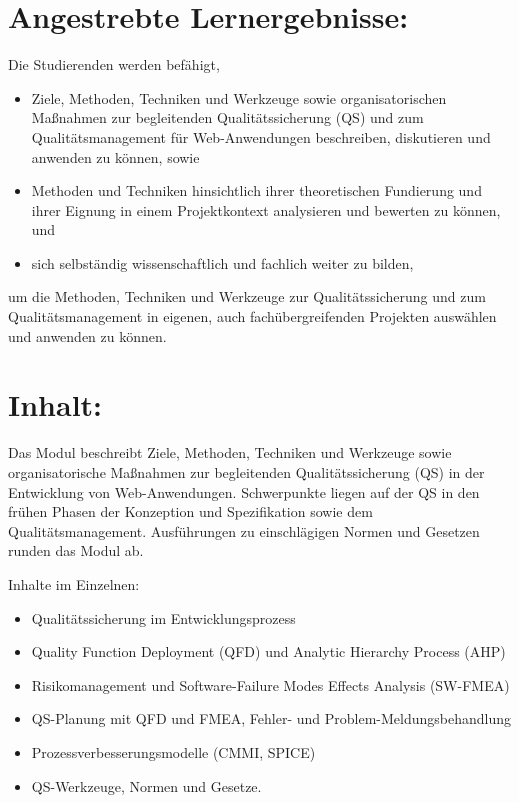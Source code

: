 \section*{Angestrebte
Lernergebnisse:}\label{angestrebte-lernergebnisse-21}

Die Studierenden werden befähigt,

\begin{itemize}
\tightlist
\item
  Ziele, Methoden, Techniken und Werkzeuge sowie organisatorischen
  Maßnahmen zur begleitenden Qualitätssicherung (QS) und zum
  Qualitätsmanagement für Web-Anwendungen beschreiben, diskutieren und
  anwenden zu können, sowie
\item
  Methoden und Techniken hinsichtlich ihrer theoretischen Fundierung und
  ihrer Eignung in einem Projektkontext analysieren und bewerten zu
  können, und
\item
  sich selbständig wissenschaftlich und fachlich weiter zu bilden,
\end{itemize}

um die Methoden, Techniken und Werkzeuge zur Qualitätssicherung und zum
Qualitätsmanagement in eigenen, auch fachübergreifenden Projekten
auswählen und anwenden zu können.

\section*{Inhalt:}\label{inhalt-21}

Das Modul beschreibt Ziele, Methoden, Techniken und Werkzeuge sowie
organisatorische Maßnahmen zur begleitenden Qualitätssicherung (QS) in
der Entwicklung von Web-Anwendungen. Schwerpunkte liegen auf der QS in
den frühen Phasen der Konzeption und Spezifikation sowie dem
Qualitätsmanagement. Ausführungen zu einschlägigen Normen und Gesetzen
runden das Modul ab.

Inhalte im Einzelnen:

\begin{itemize}
\tightlist
\item
  Qualitätssicherung im Entwicklungsprozess
\item
  Quality Function Deployment (QFD) und Analytic Hierarchy Process (AHP)
\item
  Risikomanagement und Software-Failure Modes Effects Analysis (SW-FMEA)
\item
  QS-Planung mit QFD und FMEA, Fehler- und Problem-Meldungsbehandlung
\item
  Prozessverbesserungsmodelle (CMMI, SPICE)
\item
  QS-Werkzeuge, Normen und Gesetze.
\end{itemize}

